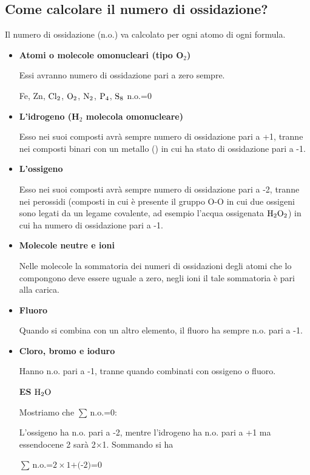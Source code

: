 \subsection{Come calcolare il numero di ossidazione?}
Il numero di ossidazione (n.o.) va calcolato per ogni atomo di ogni formula.

\begin{itemize}
  \item \textbf{Atomi o molecole omonucleari (tipo O$_2$)}
  
  Essi avranno numero di ossidazione pari a zero sempre.
  \begin{center}
    Fe, Zn, $\rm Cl_2$, $\rm O_2$, $\rm N_2$, $\rm P_4$, $\rm S_8$  n.o.=0
  \end{center}

  \item \textbf{L'idrogeno (H$_2$ molecola omonucleare)}

  Esso nei suoi composti avrà sempre numero di ossidazione pari a +1, tranne nei composti binari con un metallo () in cui ha stato di ossidazione pari a -1.
  \item \textbf{L'ossigeno}

  Esso nei suoi composti avrà sempre numero di ossidazione pari a -2, tranne nei perossidi (composti in cui è presente il gruppo O-O in cui due ossigeni sono legati da un legame covalente, ad esempio l'acqua ossigenata $\rm H_2O_2$) in cui ha numero di ossidazione pari a -1.
  \item \textbf{Molecole neutre e ioni}

  Nelle molecole la sommatoria dei numeri di ossidazioni degli atomi che lo compongono deve essere uguale a zero, negli ioni il tale sommatoria è pari alla carica.

  \item \textbf{Fluoro}

  Quando si combina con un altro elemento, il fluoro ha sempre n.o. pari a -1.
  \item \textbf{Cloro, bromo e ioduro}

  Hanno n.o. pari a -1, tranne quando combinati con ossigeno o fluoro.

  \textbf{ES} $\rm H_2O$

  Mostriamo che $\sum\,$n.o.=0:

  L'ossigeno ha n.o. pari a -2, mentre l'idrogeno ha n.o. pari a +1 ma essendocene 2 sarà 2$\times$1. Sommando si ha
  \begin{center}
    $\sum\,$n.o.=$2\times \text{1+(-2)=0}$
  \end{center}


\end{itemize}
